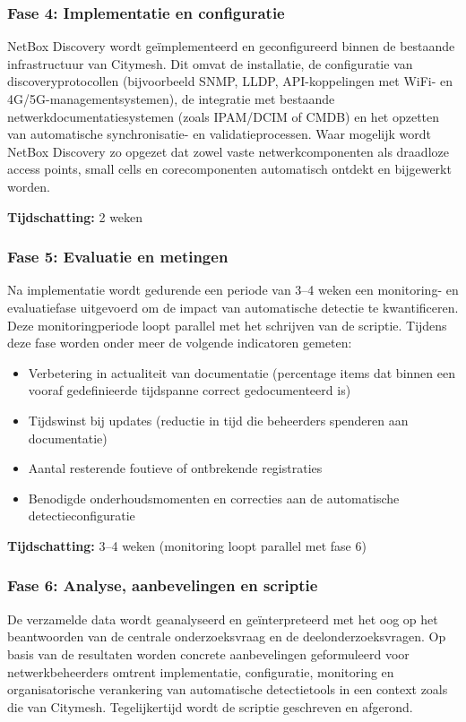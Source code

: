\subsubsection{Fase 4: Implementatie en configuratie}

NetBox Discovery wordt geïmplementeerd en geconfigureerd binnen de bestaande infrastructuur van Citymesh. Dit omvat de installatie, de configuratie van discoveryprotocollen (bijvoorbeeld SNMP, LLDP, API-koppelingen met WiFi- en 4G/5G-managementsystemen), de integratie met bestaande netwerkdocumentatiesystemen (zoals IPAM/DCIM of CMDB) en het opzetten van automatische synchronisatie- en validatieprocessen. Waar mogelijk wordt NetBox Discovery zo opgezet dat zowel vaste netwerkcomponenten als draadloze access points, small cells en corecomponenten automatisch ontdekt en bijgewerkt worden.

\textbf{Tijdschatting:} 2 weken

\subsubsection{Fase 5: Evaluatie en metingen}

Na implementatie wordt gedurende een periode van 3--4 weken een monitoring- en evaluatiefase uitgevoerd om de impact van automatische detectie te kwantificeren. Deze monitoringperiode loopt parallel met het schrijven van de scriptie. Tijdens deze fase worden onder meer de volgende indicatoren gemeten:
\begin{itemize}
  \item Verbetering in actualiteit van documentatie (percentage items dat binnen een vooraf gedefinieerde tijdspanne correct gedocumenteerd is)
  \item Tijdswinst bij updates (reductie in tijd die beheerders spenderen aan documentatie)
  \item Aantal resterende foutieve of ontbrekende registraties
  \item Benodigde onderhoudsmomenten en correcties aan de automatische detectieconfiguratie
\end{itemize}

\textbf{Tijdschatting:} 3--4 weken (monitoring loopt parallel met fase 6)

\subsubsection{Fase 6: Analyse, aanbevelingen en scriptie}

De verzamelde data wordt geanalyseerd en geïnterpreteerd met het oog op het beantwoorden van de centrale onderzoeksvraag en de deelonderzoeksvragen. Op basis van de resultaten worden concrete aanbevelingen geformuleerd voor netwerkbeheerders omtrent implementatie, configuratie, monitoring en organisatorische verankering van automatische detectietools in een context zoals die van Citymesh. Tegelijkertijd wordt de scriptie geschreven en afgerond.

